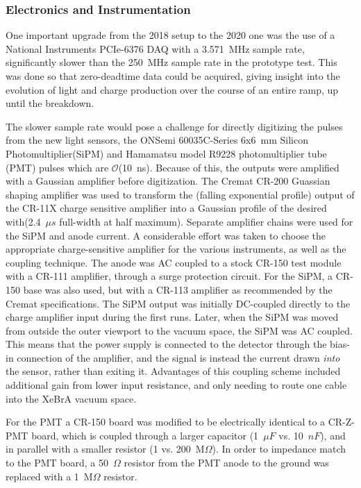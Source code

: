 \subsubsection{Electronics and Instrumentation}
One important upgrade from the 2018 setup to the 2020 one was the use of a National Instruments PCIe-6376 DAQ with a 3.571~MHz sample rate, significantly slower than the 250~MHz sample rate in the prototype test.
This was done so that zero-deadtime data could be acquired, giving insight into the evolution of light and charge production over the course of an entire  ramp, up until the breakdown.


The slower sample rate would pose a challenge for directly digitizing the pulses from the new light sensors, the ONSemi 60035C-Series 6x6~mm Silicon Photomultiplier(SiPM) and Hamamatsu model R9228 photomultiplier tube (PMT) pulses which are $\mathcal{O}$(10~ns).
Because of this, the outputs were amplified with a Gaussian amplifier before digitization.
The Cremat CR-200 Guassian shaping amplifier was used to transform the (falling exponential profile) output of the CR-11X charge sensitive amplifier into a Gaussian profile of the desired with(2.4~$\mu s$ full-width at half maximum).
Separate amplifier chains were used for the SiPM and anode current.
A considerable effort was taken to choose the appropriate charge-sensitive amplifier for the various instruments, as well as the coupling technique.
The anode was AC coupled to a stock CR-150 test module with a CR-111 amplifier, through a surge protection circuit.
For the SiPM, a CR-150 base was also used, but with a CR-113 amplifier as recommended by the Cremat specifications.
The SiPM output was initially DC-coupled directly to the charge amplifier input during the first runs.
Later, when the SiPM was moved from outside the outer viewport to the vacuum space, the SiPM was AC coupled.
This means that the power supply is connected to the detector through the bias-in connection of the amplifier, and the signal is instead the current drawn \textit{into} the sensor, rather than exiting it.
Advantages of this coupling scheme included additional  gain from lower input resistance, and only needing to route one cable into the XeBrA vacuum space.

For the PMT a CR-150 board was modified to be electrically identical to a CR-Z-PMT board, which is coupled through a larger capacitor (1~$\mu F$ vs. 10~$nF$), and in parallel with a smaller resistor (1 vs. 200~M$\Omega$).
In order to impedance match to the PMT board, a 50~$\Omega$ resistor from the PMT anode to the ground was replaced with a 1~M$\Omega$ resistor.

